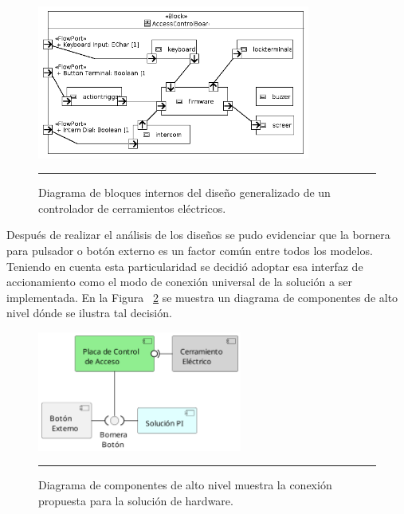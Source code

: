 \begin{figure}[htbp]
	\centering
	\includegraphics[width=0.8\textwidth]{Pictures/IBD_controladora_bw_gimp.png}
	\rule{35em}{1pt}
	\caption[Diagrama Bloques Internos Controlador]{Diagrama de bloques internos del diseño generalizado de un controlador de cerramientos eléctricos.}
	\label{fig:ibd_controladora}
\end{figure}
Después de realizar el análisis de los diseños se pudo evidenciar que la bornera para pulsador o botón externo es un factor común entre todos los modelos. Teniendo en cuenta esta particularidad se decidió adoptar esa interfaz de accionamiento como el modo de conexión universal de la solución a ser implementada. En la Figura ~\ref{fig:componentes_controladora+sol} se muestra un diagrama de componentes de alto nivel dónde se ilustra tal decisión.
\begin{figure}[htbp]
	\centering
	\includegraphics[width=0.6\textwidth]{Pictures/COMP_electric_locks.png}
	\rule{35em}{1pt}
	\caption[Diagrama de Componentes Conexión al Controlador]{Diagrama de componentes de alto nivel muestra la conexión propuesta para la solución de hardware.}
	\label{fig:componentes_controladora+sol}
\end{figure}
